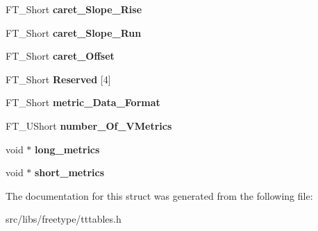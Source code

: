 \begin{DoxyCompactItemize}
\item 
\hypertarget{struct_t_t___vert_header___a3218533a7d8ac5a8ebd70a970cbdbbcc}{
FT\_\-Short {\bfseries caret\_\-Slope\_\-Rise}}
\label{struct_t_t___vert_header___a3218533a7d8ac5a8ebd70a970cbdbbcc}

\item 
\hypertarget{struct_t_t___vert_header___a98ff91b532d827440f7140d3071d473d}{
FT\_\-Short {\bfseries caret\_\-Slope\_\-Run}}
\label{struct_t_t___vert_header___a98ff91b532d827440f7140d3071d473d}

\item 
\hypertarget{struct_t_t___vert_header___a89ff9369f61dc5b770cde0eda954d402}{
FT\_\-Short {\bfseries caret\_\-Offset}}
\label{struct_t_t___vert_header___a89ff9369f61dc5b770cde0eda954d402}

\item 
\hypertarget{struct_t_t___vert_header___a54930b56bb8be0a8eb22753a9242fc5f}{
FT\_\-Short {\bfseries Reserved} \mbox{[}4\mbox{]}}
\label{struct_t_t___vert_header___a54930b56bb8be0a8eb22753a9242fc5f}

\item 
\hypertarget{struct_t_t___vert_header___aa7c3983f62f7bf736eaaaae684b65dd7}{
FT\_\-Short {\bfseries metric\_\-Data\_\-Format}}
\label{struct_t_t___vert_header___aa7c3983f62f7bf736eaaaae684b65dd7}

\item 
\hypertarget{struct_t_t___vert_header___a4ca6fe9cdd12fbc9a1129c4fbf6bddd1}{
FT\_\-UShort {\bfseries number\_\-Of\_\-VMetrics}}
\label{struct_t_t___vert_header___a4ca6fe9cdd12fbc9a1129c4fbf6bddd1}

\item 
\hypertarget{struct_t_t___vert_header___ac789245d0d6243bc965ad43702bdc671}{
void $\ast$ {\bfseries long\_\-metrics}}
\label{struct_t_t___vert_header___ac789245d0d6243bc965ad43702bdc671}

\item 
\hypertarget{struct_t_t___vert_header___ad5e875c19a02b0f6777db1c122bff2f3}{
void $\ast$ {\bfseries short\_\-metrics}}
\label{struct_t_t___vert_header___ad5e875c19a02b0f6777db1c122bff2f3}

\end{DoxyCompactItemize}


The documentation for this struct was generated from the following file:\begin{DoxyCompactItemize}
\item 
src/libs/freetype/tttables.h\end{DoxyCompactItemize}
